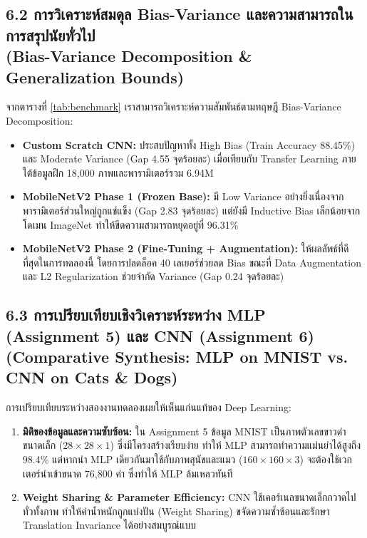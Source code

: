 \documentclass[12pt,a4paper]{article}
\begin{document}
\subsection*{6.2 การวิเคราะห์สมดุล Bias-Variance และความสามารถในการสรุปนัยทั่วไป\\ \normalsize(Bias-Variance Decomposition \& Generalization Bounds)}
จากตารางที่ \ref{tab:benchmark} เราสามารถวิเคราะห์ความสัมพันธ์ตามทฤษฎี Bias-Variance Decomposition:
\begin{itemize}[leftmargin=1.8em, itemsep=1pt]
    \item \textbf{Custom Scratch CNN:} ประสบปัญหาทั้ง High Bias (Train Accuracy 88.45\%) และ Moderate Variance (Gap 4.55 จุดร้อยละ) เมื่อเทียบกับ Transfer Learning ภายใต้ข้อมูลฝึก 18,000 ภาพและพารามิเตอร์รวม 6.94M
    \item \textbf{MobileNetV2 Phase 1 (Frozen Base):} มี Low Variance อย่างยิ่งเนื่องจากพารามิเตอร์ส่วนใหญ่ถูกแช่แข็ง (Gap 2.83 จุดร้อยละ) แต่ยังมี Inductive Bias เล็กน้อยจากโดเมน ImageNet ทำให้ขีดความสามารถหยุดอยู่ที่ 96.31\%
    \item \textbf{MobileNetV2 Phase 2 (Fine-Tuning + Augmentation):} ให้ผลลัพธ์ที่ดีที่สุดในการทดลองนี้ โดยการปลดล็อค 40 เลเยอร์ช่วยลด Bias ขณะที่ Data Augmentation และ L2 Regularization ช่วยจำกัด Variance (Gap 0.24 จุดร้อยละ)
\end{itemize}

\subsection*{6.3 การเปรียบเทียบเชิงวิเคราะห์ระหว่าง MLP (Assignment 5) และ CNN (Assignment 6)\\ \normalsize(Comparative Synthesis: MLP on MNIST vs. CNN on Cats \& Dogs)}
การเปรียบเทียบระหว่างสองงานทดลองเผยให้เห็นแก่นแท้ของ Deep Learning:
\begin{enumerate}[leftmargin=1.8em, itemsep=0.5pt, topsep=1pt, parsep=0pt]
    \item \textbf{มิติของข้อมูลและความซับซ้อน:} ใน Assignment 5 ข้อมูล MNIST เป็นภาพตัวเลขขาวดำขนาดเล็ก ($28 \times 28 \times 1$) ซึ่งมีโครงสร้างเรียบง่าย ทำให้ MLP สามารถทำความแม่นยำได้สูงถึง 98.4\% แต่หากนำ MLP เดียวกันมาใช้กับภาพสุนัขและแมว ($160 \times 160 \times 3$) จะต้องใช้เวกเตอร์นำเข้าขนาด 76,800 ค่า ซึ่งทำให้ MLP ล้มเหลวทันที
    \item \textbf{Weight Sharing \& Parameter Efficiency:} CNN ใช้เคอร์เนลขนาดเล็กกวาดไปทั่วทั้งภาพ ทำให้ค่าน้ำหนักถูกแบ่งปัน (Weight Sharing) ขจัดความซ้ำซ้อนและรักษา Translation Invariance ได้อย่างสมบูรณ์แบบ
\end{enumerate}
\end{document}
